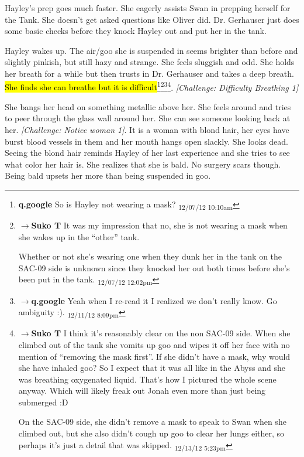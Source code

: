 Hayley's prep goes much faster.  She eagerly assists Swan in prepping herself for the Tank.  She doesn't get asked questions like Oliver did.  Dr. Gerhauser just does some basic checks before they knock Hayley out and put her in the tank.



Hayley wakes up.  The air/goo she is suspended in seems brighter than before and slightly pinkish, but still hazy and strange.  She feels sluggish and odd.  She holds her breath for a while but then trusts in Dr. Gerhauser and takes a deep breath.  \hl{She finds she can breathe but it is difficult}\footnote{\textbf{q.google }So is Hayley not wearing a mask? \textsubscript{12/07/12 10:10am}}\footnote{$\rightarrow$\textbf{Suko T }It was my impression that no, she is not wearing a mask when she wakes up in the ``other'' tank.

Whether or not she's wearing one when they dunk her in the tank on the SAC-09 side is unknown since they knocked her out both times before she's been put in the tank. \textsubscript{12/07/12 12:02pm}}\footnote{$\rightarrow$\textbf{q.google }Yeah when I re-read it I realized we don't really know.  Go ambiguity :). \textsubscript{12/11/12 8:09pm}}\footnote{$\rightarrow$\textbf{Suko T }I think it's reasonably clear on the non SAC-09 side.  When she climbed out of the tank she vomits up goo and wipes it off her face with no mention of ``removing the mask first''.  If she didn't have a mask, why would she have inhaled goo?  So I expect that it was all like in the Abyss and she was breathing oxygenated liquid.  That's how I pictured the whole scene anyway.  Which will likely freak out Jonah even more than just being submerged :D

On the SAC-09 side, she didn't remove a mask to speak to Swan when she climbed out, but she also didn't cough up goo to clear her lungs either, so perhaps it's just a detail that was skipped. \textsubscript{12/13/12 5:23pm}}. \textit{{[}Challenge: Difficulty Breathing 1{]}}



She bangs her head on something metallic above her.  She feels around and tries to peer through the glass wall around her.  She can see someone looking back at her.  \textit{{[}Challenge: Notice woman 1{]}}.  It is a woman with blond hair, her eyes have burst blood vessels in them and her mouth hangs open slackly.  She looks dead.  Seeing the blond hair reminds Hayley of her last experience and she tries to see what color her hair is.  She realizes that she is bald.  No surgery scars though.  Being bald upsets her more than being suspended in goo.



